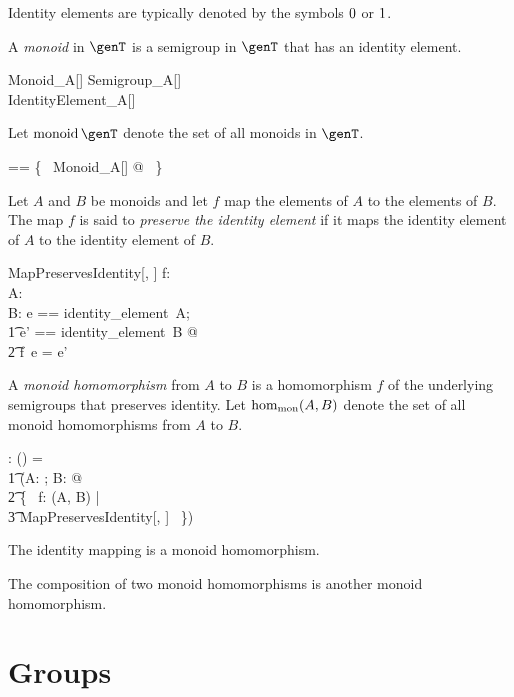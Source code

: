 \documentclass{amsart}
\begin{document}
Identity elements are typically denoted by the symbols  $0$ or $1$.

A {\em monoid} in $\genT$ is a semigroup in $\genT$ that has an identity element.
\begin{schema}{Monoid\_A}[\genT]
	Semigroup\_A[\genT] \\
	IdentityElement\_A[\genT]
\end{schema}

Let $\monoid \genT$ denote the set of all monoids in $\genT$.
\begin{zed}
	\monoid \genT == \{~ Monoid\_A[\genT] @ \strucA ~\}
\end{zed}


Let $A$ and $B$ be monoids and let $f$ map the elements of $A$ to the elements of $B$.
The map $f$ is said to {\em preserve the identity element} if it maps the identity element of $A$
to the identity element of $B$.
\begin{schema}{MapPreservesIdentity}[\genT, \genU]
	f: \genT \pfun \genU \\
	A: \monoid \genT \\
	B: \monoid \genU
\where
\LET e == identity\_element~A; \\
\t1	e' == identity\_element~B @ \\
\t2		f~e = e'
\end{schema}

A {\em monoid homomorphism} from $A$ to $B$ is a homomorphism $f$ of the underlying semigroups
that preserves identity.
Let $\operatorname{hom_{mon}}(A, B)$ denote the set of all monoid homomorphisms from $A$ to $B$.
\begin{gendef}[\genT, \genU]
	\homMonoid: \monoid \genT \cross \monoid \genU \fun \power (\genT \fun \genU)
\where
	\homMonoid = \\
	\t1	(\lambda A: \monoid \genT; B: \monoid \genU @ \\
	\t2		\{~ f: \homSemigroup(A, B) | \\
	\t3			MapPreservesIdentity[\genT, \genU] ~\})
\end{gendef}

\begin{remark}
The identity mapping is a monoid homomorphism.
\end{remark}

\begin{remark}
The composition of two monoid homomorphisms is another monoid homomorphism.
\end{remark}

\section{Groups}
\end{document}
